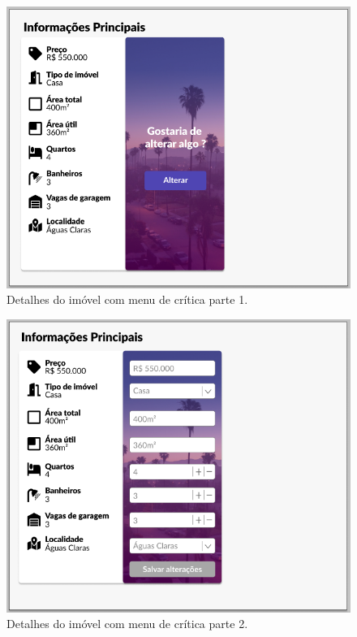\begin{figure}[H]
    \centering
    \includegraphics[scale=0.5]{figuras/proposta/prototipo1.jpg}
    \caption[Detalhes do imóvel com menu de crítica parte 1]{Detalhes do imóvel com menu de crítica parte 1.}
    \label{fig:prototipo_critico1}
\end{figure}

\begin{figure}[H]
    \centering
    \includegraphics[scale=0.5]{figuras/proposta/prototipo2.jpg}
    \caption[Detalhes do imóvel com menu de crítica parte 2]{Detalhes do imóvel com menu de crítica parte 2.}
    \label{fig:prototipo_critico2}
\end{figure}

